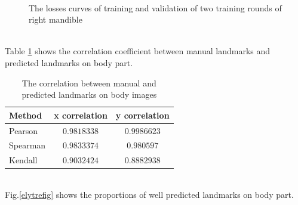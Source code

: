 \documentclass[12pt,a4paper]{article}
\begin{document}
\begin{figure}[h!]
\centering
{}~~
\caption{The losses curves of training and validation of two training rounds of right mandible  }
\label{losselytrecurves}
\end{figure}~\\[3cm]
Table \ref{corrbody} shows the correlation coefficient between manual landmarks and predicted landmarks on body part.
\begin{table}[h!]
	\centering
	\begin{tabular}{l c c}
		Method & x correlation & y correlation \\ \hline
		Pearson & $0.9818338$ & $0.9986623$ \\ \hline
		Spearman & $0.9833374$ & $0.980597$ \\ \hline
		Kendall & $0.9032424$ & $0.8882938$ \\ \hline
	\end{tabular}
	\caption{The correlation between manual and predicted landmarks on body images}
	\label{corrbody}
\end{table}~\\
Fig.\ref{elytrefig} shows the proportions of well predicted landmarks on body part.
\end{document}
